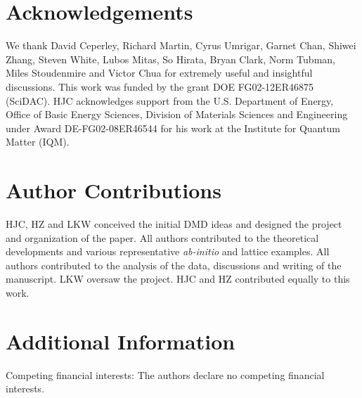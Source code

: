 \section{Acknowledgements} 
We thank  David Ceperley,  Richard Martin, Cyrus Umrigar,  Garnet Chan,  Shiwei Zhang, Steven White,  
Lubos Mitas, So Hirata, Bryan Clark, Norm Tubman, Miles Stoudenmire and Victor Chua for extremely useful and insightful discussions. 
This work was funded by the grant DOE FG02-12ER46875 (SciDAC). HJC acknowledges support from the U.S. Department of Energy, 
Office of Basic Energy Sciences, Division of Materials Sciences and Engineering under Award DE-FG02-08ER46544 for his work at the Institute for Quantum Matter (IQM). 

\section*{Author Contributions}
HJC, HZ and LKW conceived the initial DMD ideas and designed the project and organization of the paper. 
All authors contributed to the theoretical developments and various representative \textit{ab-initio} and lattice examples. 
All authors contributed to the analysis of the data, discussions and writing of the manuscript. 
LKW oversaw the project. HJC and HZ contributed equally to this work.
 
\section*{Additional Information}
Competing financial interests: The authors declare no competing financial interests.
